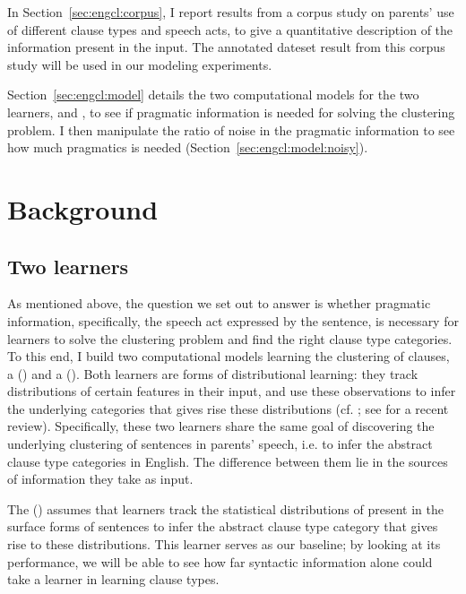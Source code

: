 In Section~\ref{sec:engcl:corpus}, I report results from a corpus study on parents' use of different clause types and speech acts, to give a quantitative description of the information present in the input. The annotated dateset result from this corpus study will be used in our modeling experiments.

Section~\ref{sec:engcl:model} details the two computational models for the two learners, \dlearnerabbr{} and \plearnerabbr{}, to see if pragmatic information is needed for solving the clustering problem. I then manipulate the ratio of noise in the pragmatic information to see how much pragmatics is needed (Section~\ref{sec:engcl:model:noisy}). 

\section{Background}
\label{sec:engcl:background}

\subsection{Two learners} 
\label{sec:engcl:bg:learners}
As mentioned above, the question we set out to answer is whether pragmatic information, specifically, the speech act expressed by the sentence, is necessary for learners to solve the clustering problem and find the right clause type categories. To this end, I build two computational models learning the clustering of clauses, a \text{\distlearner{}} (\dlearnerabbr{}) and a \text{\praglearner{}} (\plearnerabbr{}). Both learners are forms of distributional learning: they track distributions of certain features in their input, and use these observations to infer the underlying categories that gives rise these distributions
(cf. \cite{feldman2013,gagliardi2017modeling,perkins2022vmodel,perkins2019,nguyenwilson2021}; see \cite{pearl2020review} for a recent review). Specifically, these two learners share the same goal of discovering the underlying clustering of sentences in parents' speech, i.e. to infer the abstract clause type categories in English. The difference between them lie in the sources of information they take as input. 

The \tbf{\distlearner{}} (\dlearnerabbr{}) assumes that learners track the statistical distributions of  present in the surface forms of sentences to infer the abstract clause type category that gives rise to these distributions. This learner serves as our baseline; by looking at its performance, we will be able to see how far syntactic information alone could take a learner in learning clause types. 

